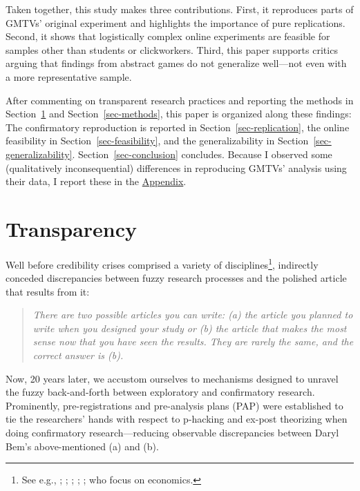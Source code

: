 \documentclass[
  authoryear,
  review,
  3p,
  onecolumn]{elsarticle}
\begin{document}
Taken together, this study makes three contributions. First, it
reproduces parts of GMTVs' original experiment and highlights the
importance of pure replications. Second, it shows that logistically
complex online experiments are feasible for samples other than students
or clickworkers. Third, this paper supports critics arguing that
findings from abstract games do not generalize well---not even with a
more representative sample.

After commenting on transparent research practices and reporting the
methods in Section~\ref{sec-transparency} and Section~\ref{sec-methods},
this paper is organized along these findings: The confirmatory
reproduction is reported in Section~\ref{sec-replication}, the online
feasibility in Section~\ref{sec-feasibility}, and the generalizability
in Section~\ref{sec-generalizability}. Section~\ref{sec-conclusion}
concludes. Because I observed some (qualitatively inconsequential)
differences in reproducing GMTVs' analysis using their data, I report
these in the \href{@sec-appendix}{Appendix}.

\hypertarget{sec-transparency}{%
\section{Transparency}\label{sec-transparency}}

Well before credibility crises comprised a variety of
disciplines\footnote{See e.g., \citet{CamererEtAl2016};
  \citet{BrodeurEtAl2016}; \citet{BrodeurEtAl2020};
  \citet{ChristensenMiguel2018}; \citet{FerraroShukla2020};
  \citet{PageEtAl2021} who focus on economics.},
\citet[p.~2]{bemwriting} indirectly conceded discrepancies between fuzzy
research processes and the polished article that results from it:

\begin{quote}
\emph{There are two possible articles you can write: (a) the article you
planned to write when you designed your study or (b) the article that
makes the most sense now that you have seen the results. They are rarely
the same, and the correct answer is (b).}
\end{quote}

Now, 20 years later, we accustom ourselves to mechanisms designed to
unravel the fuzzy back-and-forth between exploratory and confirmatory
research. Prominently, pre-registrations and pre-analysis plans (PAP)
\citep[see, e.g.,][]{BrodeurEtAl2022} were established to tie the
researchers' hands with respect to p-hacking and ex-post theorizing when
doing confirmatory research---reducing observable discrepancies between
Daryl Bem's above-mentioned (a) and (b).
\end{document}

